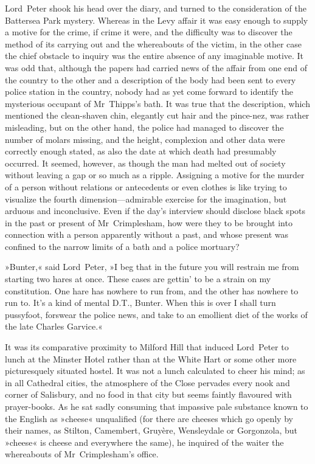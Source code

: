 Lord~Peter shook his head over the diary, and turned to the consideration of the Battersea Park mystery. Whereas in the Levy affair it was easy enough to supply a motive for the crime, if crime it were, and the difficulty was to discover the method of its carrying out and the whereabouts of the victim, in the other case the chief obstacle to inquiry was the entire absence of any imaginable motive. It was odd that, although the papers had carried news of the affair from one end of the country to the other and a description of the body had been sent to every police station in the country, nobody had as yet come forward to identify the mysterious occupant of Mr~Thipps's bath. It was true that the description, which mentioned the clean-shaven chin, elegantly cut hair and the pince-nez, was rather misleading, but on the other hand, the police had managed to discover the number of molars missing, and the height, complexion and other data were correctly enough stated, as also the date at which death had presumably occurred. It seemed, however, as though the man had melted out of society without leaving a gap or so much as a ripple. Assigning a motive for the murder of a person without relations or antecedents or even clothes is like trying to visualize the fourth dimension—admirable exercise for the imagination, but arduous and inconclusive. Even if the day's interview should disclose black spots in the past or present of Mr~Crimplesham, how were they to be brought into connection with a person apparently without a past, and whose present was confined to the narrow limits of a bath and a police mortuary?

»Bunter,« said Lord~Peter, »I beg that in the future you will restrain me from starting two hares at once. These cases are gettin' to be a strain on my constitution. One hare has nowhere to run from, and the other has nowhere to run to. It's a kind of mental D\@.T\@., Bunter. When this is over I shall turn pussyfoot, forswear the police news, and take to an emollient diet of the works of the late Charles Garvice.«

It was its comparative proximity to Milford Hill that induced Lord~Peter to lunch at the Minster Hotel rather than at the White Hart or some other more picturesquely situated hostel. It was not a lunch calculated to cheer his mind; as in all Cathedral cities, the atmosphere of the Close pervades every nook and corner of Salisbury, and no food in that city but seems faintly flavoured with prayer-books. As he sat sadly consuming that impassive pale substance known to the English as »cheese« unqualified (for there are cheeses which go openly by their names, as Stilton, Camembert, Gruyère, Wensleydale or Gorgonzola, but »cheese« is cheese and everywhere the same), he inquired of the waiter the whereabouts of Mr~Crimplesham's office.

